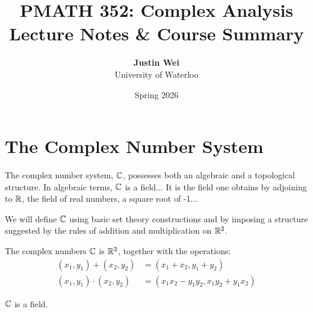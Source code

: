 \documentclass[11pt]{article}
\title{\textbf{PMATH 352: Complex Analysis}\\ \Large Lecture Notes \& Course Summary}
\author{\textbf{Justin Wei} \\ University of Waterloo}
\date{Spring 2026}
\begin{document}
\maketitle
\newpage
\tableofcontents
\newpage

\section{The Complex Number System}

\begin{textquote}
  The complex number system, ${\mathbb{C}}$, possesses both an algebraic and a topological structure. In algebraic terms, ${\mathbb{C}}$ is a field... It is the field one obtains by adjoining to ${\mathbb{R}}$, the field of real numbers, a square root of -1...
\end{textquote}

We will define ${\mathbb{C}}$ using basic set theory constructions and by imposing a structure suggested by the rules of addition and multiplication on ${\mathbb{R}}^2$. 

\begin{definition}
The complex numbers ${\mathbb{C}}$ is ${\mathbb{R}}^2$, together with the operations:
\begin{align*}
(x_1, y_1) + (x_2, y_2) &= (x_1 + x_2, y_1 + y_2) \\
(x_1, y_1) \cdot (x_2, y_2) &= (x_1 x_2 - y_1 y_2, x_1 y_2 + y_1 x_2)
\end{align*}
\end{definition}

\begin{theorem}
${\mathbb{C}}$ is a field.
\end{theorem}
\end{document}
